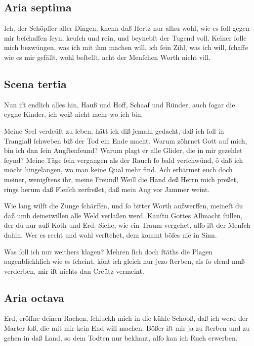 \documentclass{ees}
\newenvironment{lyrics}[1]{%
  \subsection{#1}\nopagebreak%
  \begin{lyricslist}%
  \let\voice\item%
}{%
  \end{lyricslist}%
}
\begin{document}
\begin{lyrics}{Aria septima}
  \voice[Schöpffer]
  Ich, der Schöpffer aller Dingen,
  khenn daß Hertz nur allzu wohl,
  wie es ſoll
  gegen mir beſchaffen ſeyn,
  keuſch und rein,
  und beynebſt der Tugend voll.
  Keiner ſolle mich bezwüngen,
  was ich mit ihm machen will,
  ich ſein Zihl,
  was ich will,
  ſchaffe wie es mir gefällt,
  wohl beſtellt,
  acht der Menſchen Worth nicht vill.
\end{lyrics}

\begin{lyrics}{Scena tertia}
  \voice[Jobs Frau]
  Nun iſt endlich alles hin,
  Hauß und Hoff, Schaaf und Ründer,
  auch ſogar die eygne Kinder,
  ich weiß nicht mehr wo ich bin.

  \voice[Job]
  Meine Seel verdeüſt zu leben,
  hätt ich diß jemahl gedacht,
  daß ich ſoll in Trangſall ſchweben
  biß der Tod ein Ende macht.
  Warum zöhrnet Gott auf mich,
  bin ich dan ſein Angſtenfeund?
  Warum plagt er alle Glider,
  die in mir gezehlet ſeynd?
  Meine Täge ſein vergangen
  als der Rauch ſo bald verſchwünd,
  ô daß ich möcht hingelangen,
  wo man keine Qual mehr find.
  Ach erbarmet euch doch meiner,
  wenigſtens ihr, meine Freund!
  Weill die Hand deß Herrn mich preßet,
  rings herum daß Fleiſch zerfreßet,
  daß mein Aug vor Jammer weint.

  \voice[Eliphas]
  Wie lang wilſt die Zunge ſchärffen,
  und ſo bitter Worth außwerffen,
  meineſt du daß umb deinetwillen
  alle Weld verlaßen werd.
  Kanſtu Gottes Allmacht ſtillen,
  der du nur auß Koth und Erd.
  Siehe, wie ein Traum vergehet,
  alſo iſt der Menſch dahin.
  Wer es recht und wohl verſtehet,
  dem kommt böſes nie in Sinn.

  \voice[Jobs Frau]
  Was ſoll ich nur weithers klagen?
  Mehren ſich doch ſtäths die Plagen
  augenblickhlich wie es ſcheint,
  könt ich gleich nur jezo ſterben,
  als ſo elend muß verderben,
  mir iſt nichts dan Creütz vermeint.
\end{lyrics}

\begin{lyrics}{Aria octava}
  \voice[Jobs Frau]
  Erd, eröffne deinen Rachen,
  ſchluckh mich in die kühle Schooß,
  daß ich werd der Marter loß,
  die mit mir kein End will machen.
  Bößer iſt mir ja zu ſterben
  und zu gehen in daß Land,
  so dem Todten nur bekhant,
  alſo kan ich Rueh erwerben.
\end{lyrics}
\end{document}
